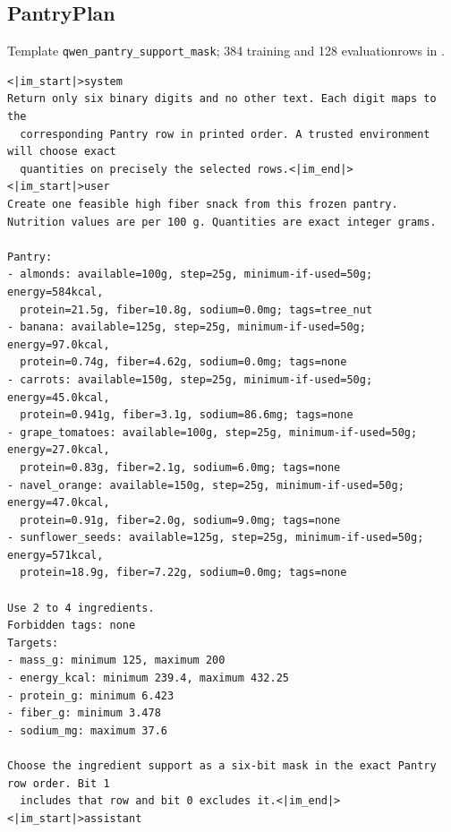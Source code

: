 \documentclass{article}
\newcommand{\1}{\mathbf 1}
\theoremstyle{remark}
\theoremstyle{definition}
\theoremstyle{plain}
\begin{document}
\subsection{PantryPlan}
\label{app:prompt-pantry}

\noindent Template \texttt{qwen\_pantry\_support\_mask}; 384 training and 128 evaluation\newline rows in .

\begin{Verbatim}[fontsize=\scriptsize,frame=single,framesep=4pt,rulecolor=\color{black!25},samepage=false]
<|im_start|>system
Return only six binary digits and no other text. Each digit maps to the
  corresponding Pantry row in printed order. A trusted environment will choose exact
  quantities on precisely the selected rows.<|im_end|>
<|im_start|>user
Create one feasible high fiber snack from this frozen pantry.
Nutrition values are per 100 g. Quantities are exact integer grams.

Pantry:
- almonds: available=100g, step=25g, minimum-if-used=50g; energy=584kcal,
  protein=21.5g, fiber=10.8g, sodium=0.0mg; tags=tree_nut
- banana: available=125g, step=25g, minimum-if-used=50g; energy=97.0kcal,
  protein=0.74g, fiber=4.62g, sodium=0.0mg; tags=none
- carrots: available=150g, step=25g, minimum-if-used=50g; energy=45.0kcal,
  protein=0.941g, fiber=3.1g, sodium=86.6mg; tags=none
- grape_tomatoes: available=100g, step=25g, minimum-if-used=50g; energy=27.0kcal,
  protein=0.83g, fiber=2.1g, sodium=6.0mg; tags=none
- navel_orange: available=150g, step=25g, minimum-if-used=50g; energy=47.0kcal,
  protein=0.91g, fiber=2.0g, sodium=9.0mg; tags=none
- sunflower_seeds: available=125g, step=25g, minimum-if-used=50g; energy=571kcal,
  protein=18.9g, fiber=7.22g, sodium=0.0mg; tags=none

Use 2 to 4 ingredients.
Forbidden tags: none
Targets:
- mass_g: minimum 125, maximum 200
- energy_kcal: minimum 239.4, maximum 432.25
- protein_g: minimum 6.423
- fiber_g: minimum 3.478
- sodium_mg: maximum 37.6

Choose the ingredient support as a six-bit mask in the exact Pantry row order. Bit 1
  includes that row and bit 0 excludes it.<|im_end|>
<|im_start|>assistant
\end{Verbatim}


\end{document}
